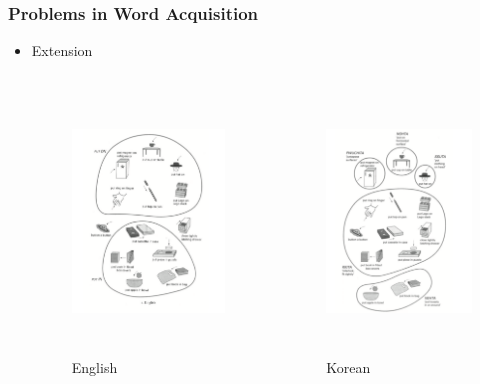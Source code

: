 \documentclass{beamer}
\begin{document}
\begin{frame}
\frametitle{Problems in Word Acquisition}
\begin{itemize}
\item Extension 
\begin{columns}
\begin{column}{0.45\textwidth}
\begin{figure}
    \includegraphics[height = 7cm, keepaspectratio]{english.png}
    \caption{English}
\end{figure}
\end{column}
\begin{column}{0.45\textwidth}
\begin{figure}
    \includegraphics[height = 7cm, keepaspectratio]{korean.png}
    \caption{Korean}
\end{figure}
\end{column}
\end{columns}
\end{itemize}
\end{frame}
\end{document}
